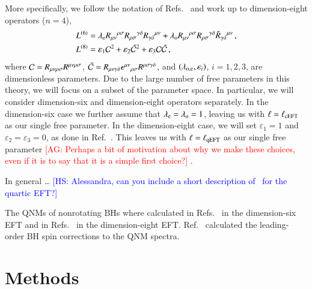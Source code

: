 \documentclass[twocolumn,
               prd,
               aps,
               superscriptaddress,
               tightenlines,
               nofootinbib,
               eqsecnum,
               amsfonts,
               amsmath,
               longbibliography]{revtex4-1}
\newcommand{\lame}{\lambda_{\rm e}}
\newcommand{\lamo}{\lambda_{\rm o}}
\newcommand{\agcomm}[1]{{\textcolor{red}{{[AG: #1]}} }}
\newcommand{\hs}[1]{{\textcolor{blue}{{[HS: #1]}} }}
\begin{document}
More specifically, we follow the notation of
Refs.~\cite{Cano:2020cao,Cano:2021myl} and work up to dimension-eight operators
($n=4$),
%
\begin{subequations}
\label{eq:action_mods}
\begin{align}
    L^{(6)} &= \lame R_{\mu\nu}{}^{\rho\sigma} R_{\rho\sigma}{}^{\gamma\delta} R_{\gamma \delta}{}^{\mu\nu}
    + \lamo R_{\mu\nu}{}^{\rho\sigma} R_{\rho\sigma}{}^{\gamma\delta} \tilde{R}_{\gamma \delta}{}^{\mu\nu}\,,
    \label{eq:s_6}
    \\
    L^{(8)} &= \varepsilon_{1} \mathcal{C}^2
    + \varepsilon_{2} \tilde{\mathcal{C}}^{2}
    + \varepsilon_{3} \mathcal{C} \tilde{\mathcal{C}}\,,
\label{eq:s_8}
\end{align}
\end{subequations}
%
where ${\cal C} = R_{\mu\nu\rho\sigma} R^{\mu\nu\rho\sigma}$,
$\tilde{\cal C} = R_{\mu\nu\gamma\delta} \epsilon^{\mu\nu}{}_{\rho\sigma} R^{\rho\sigma\gamma\delta}$,
and $(\lambda_{\rm o, e},\varepsilon_{i})$,  $i=1,2,3$, are dimensionless parameters.
%
Due to the large number of free parameters in this theory, we will focus on a subset of the parameter space.
%
In particular, we will consider dimension-six and dimension-eight operators separately.
%
In the dimension-six case we further assume that $\lame = \lamo = 1$, leaving us with $\ell = \ell_{\rm cEFT}$
as our single free parameter.
%
In the dimension-eight case, we will set $\varepsilon_{1} = 1$ and $\varepsilon_{2} = \varepsilon_{3} = 0$,
as done in Ref.~\cite{Sennett:2019bpc}.
%
This leaves us with $\ell = \ell_{\rm qEFT}$ as our single free parameter \agcomm{Perhaps a bit of motivation about why we make these choices, even if it is to say that it is a simple first choice?}.

In general \dots
%
\hs{Alessandra, can you include a short description of~\cite{Sennett:2019bpc} for the quartic EFT?}

The QNMs of nonrotating BHs where calculated in Refs.~\cite{deRham:2020ejn,Cano:2020cao} in the dimension-six EFT
and in Refs.~\cite{Cardoso:2018ptl,Cano:2020cao} in the dimension-eight EFT.
%
Ref.~\cite{Cano:2020cao} calculated the leading-order BH spin corrections to the QNM spectra.

\section{Methods}
\label{sec:method}
\end{document}
